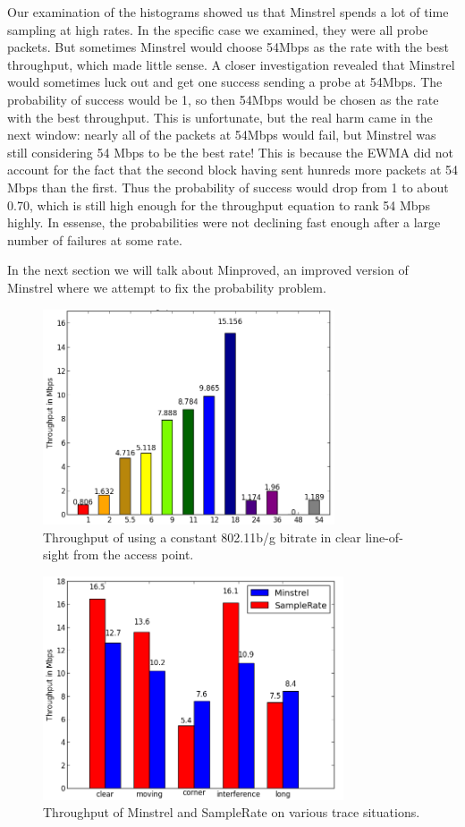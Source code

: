 \documentclass[letterpaper,twocolumn,10pt]{article}
\begin{document}
Our examination of the histograms showed us that Minstrel spends a lot of time sampling at high rates. In the specific case we examined, they were all probe packets. But sometimes Minstrel would choose 54Mbps as the rate with the best throughput, which made little sense. A closer investigation revealed that Minstrel would sometimes luck out and get one success sending a probe at 54Mbps. The probability of success would be 1, so then 54Mbps would be chosen as the rate with the best throughput. This is unfortunate, but the real harm came in the next window: nearly all of the packets at 54Mbps would fail, but Minstrel was still considering 54 Mbps to be the best rate! This is because the EWMA did not account for the fact that the second block having sent hunreds more packets at 54 Mbps than the first. Thus the probability of success would drop from 1 to about 0.70, which is still high enough for the throughput equation to rank 54 Mbps highly. In essense, the probabilities were not declining fast enough after a large number of failures at some rate.

In the next section we will talk about Minproved, an improved version of Minstrel where we attempt to fix the probability problem. 

\begin{figure}[htb]
  \hspace{-1em}\includegraphics[width=3.4in]{constant.png}\vspace{-0em}
  \caption{Throughput of using a constant 802.11b/g bitrate in clear line-of-sight from the access point.}
\label{figure:2}
\end{figure}


\begin{figure}[htb]
  \hspace{-.75em}\includegraphics[width=3.5in]{MinVSSam1.png}\vspace{-0.75em}
  \caption{Throughput of Minstrel and SampleRate on various trace situations.}
\label{figure:3}
\end{figure}
\end{document}

